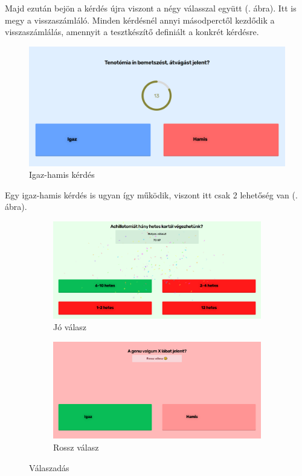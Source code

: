 Majd ezután bejön a kérdés újra viszont a négy válasszal együtt (. ábra). Itt is megy a visszaszámláló. Minden kérdésnél annyi másodperctől kezdődik a visszaszámlálás, amennyit a tesztkészítő definiált a konkrét kérdésre.

\begin{figure}[H]
    \centering
    \includegraphics[width=\linewidth]{images/question2.png}
    \caption{Igaz-hamis kérdés}
    \label{fig:question2}
\end{figure}

Egy igaz-hamis kérdés is ugyan így működik, viszont itt csak 2 lehetőség van (. ábra).

\begin{figure}[H]
    \centering
    \begin{subfigure}{0.5\textwidth}
        \centering
        \includegraphics[width=\linewidth]{images/question_good.png}
        \caption{Jó válasz}
    \end{subfigure}%
    \begin{subfigure}{0.5\textwidth}
        \centering
        \includegraphics[width=\linewidth]{images/question_wrong.png}
        \caption{Rossz válasz}
    \end{subfigure}
    \caption{Válaszadás}
    \label{fig:question_good_wrong}
\end{figure}

